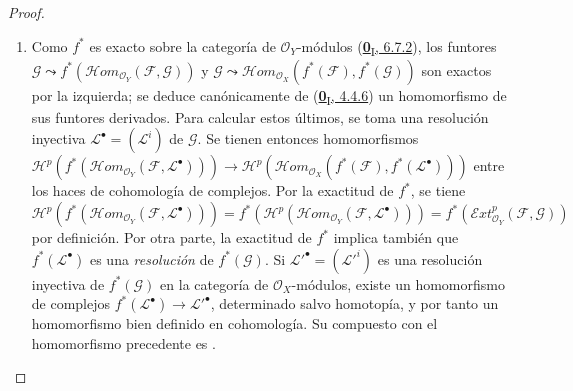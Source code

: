 \begin{proof}
\begin{enumerate}
  \item[\rm(i)]
  Como $f^*$ es exacto sobre la categoría de $\mathcal O_Y$-módulos (\hyperref[0.6.7.2-fr]{\textbf{0}\textsubscript{I}, 6.7.2}), los funtores $\mathcal G\leadsto f^*(\mathcal{H}om_{\mathcal O_Y}(\mathcal F,\mathcal G))$ y $\mathcal G\leadsto\mathcal{H}om_{\mathcal O_X}(f^*(\mathcal F),f^*(\mathcal G))$ son exactos por la izquierda; se deduce canónicamente de (\hyperref[0.4.4.6-fr]{\textbf{0}\textsubscript{I}, 4.4.6}) un homomorfismo de sus funtores derivados. Para calcular estos últimos, se toma una resolución inyectiva $\mathcal L^\bullet=(\mathcal L^i)$ de $\mathcal G$.  Se tienen entonces
  homomorfismos
  $\mathcal H^p(f^*(\mathcal{H}om_{\mathcal O_Y}(\mathcal F,\mathcal L^\bullet)))\longrightarrow\mathcal H^p(\mathcal{H}om_{\mathcal O_X}(f^*(\mathcal F),f^*(\mathcal L^\bullet)))$
  entre los haces de cohomología de complejos.
  Por la exactitud de $f^*$, se tiene $\mathcal H^p(f^*(\mathcal{H}om_{\mathcal O_Y}(\mathcal F,\mathcal L^\bullet)))=f^*(\mathcal H^p(\mathcal{H}om_{\mathcal O_Y}(\mathcal F,\mathcal L^\bullet)))=f^*(\mathcal{E}xt_{\mathcal O_Y}^p(\mathcal F,\mathcal G))$ por definición. Por otra parte, la exactitud de $f^*$ implica también que
  $f^*(\mathcal L^\bullet)$ es una \emph{resolución} de $f^*(\mathcal G)$.
  Si $\mathcal L'^\bullet=(\mathcal L'^{i})$ es una resolución inyectiva
  de $f^*(\mathcal G)$ en la categoría de $\mathcal O_X$-módulos, existe un
  homomorfismo de complejos
  $f^*(\mathcal L^\bullet)\to\mathcal L'^\bullet$,
  determinado salvo homotopía, y por tanto un homomorfismo bien definido en
  cohomología.  Su compuesto con el homomorfismo precedente es
  .


\end{enumerate}
\end{proof}
